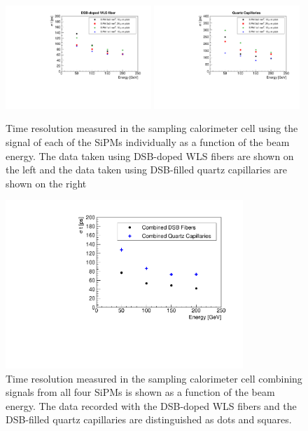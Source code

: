 \begin{figure}[!htb]
\centering
\includegraphics[width=0.49\textwidth]{figures/ShashlikTimeResolutionVsEnergy_DSB.pdf}
\includegraphics[width=0.49\textwidth]{figures/ShashlikTimeResolutionVsEnergy_Capillaries.pdf}
\caption{\label{TimeResolutionVsEnergy} Time resolution measured in the sampling calorimeter 
cell using the signal of each of the SiPMs individually as a function of the beam energy. 
The data taken using DSB-doped WLS fibers are shown on
the left and the data taken using DSB-filled quartz capillaries are shown on the right}
\end{figure}



\begin{figure}[!htb]
\centering
\includegraphics[width=0.8\textwidth]{figures/ShashlikTimeResolutionCombinedChannelVsEnergy.pdf}
\caption{\label{TimeResolutionCombined}  Time resolution measured in the sampling calorimeter cell combining signals from all four  
SiPMs is shown as a function of the beam energy.  The data recorded with the DSB-doped WLS fibers and the
DSB-filled quartz capillaries are distinguished as dots and squares.}
\end{figure}



